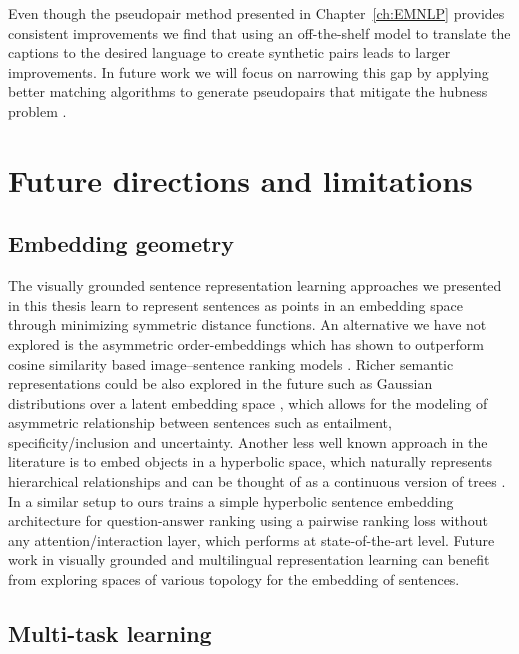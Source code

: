 Even though the pseudopair method presented in Chapter~\ref{ch:EMNLP} provides consistent improvements
we find that using an off-the-shelf model to translate the captions to the desired language to create 
synthetic pairs leads to larger improvements. In future work we will focus on narrowing this gap by applying
better matching algorithms to generate pseudopairs that mitigate the hubness problem \cite{radovanovic2010existence,tomavsev2011influence,tomavsev2011probabilistic,dinu2014improving}. 

 

\section{Future directions and limitations}

\subsection{Embedding geometry}

The visually grounded sentence representation learning approaches 
we presented in this thesis learn to represent sentences as points
in an embedding space through minimizing symmetric distance functions. 
An alternative we have not explored is the asymmetric order-embeddings 
\citep{vendrov2015order} which has shown to outperform cosine similarity based 
image--sentence ranking models \citep{faghri2017vse++}. 
Richer semantic representations could be also explored in the future such as Gaussian 
distributions over a latent embedding 
space \citep{vilnis2014word}, which allows for the modeling of asymmetric relationship between sentences
such as entailment, specificity/inclusion and uncertainty. 
Another less well known approach in the literature is to embed objects in a
hyperbolic space, which naturally represents hierarchical relationships and can be thought of as a
continuous version of trees \citep{krioukov2010hyperbolic}.  In a similar setup to ours 
\cite{tay2018hyperbolic} 
trains a simple hyperbolic sentence embedding architecture for question-answer 
ranking using a pairwise ranking loss without any attention/interaction layer, 
which performs at state-of-the-art level. 
Future work in visually grounded and multilingual representation learning can benefit from exploring
spaces of various topology for the embedding of sentences. 



\subsection{Multi-task learning}

